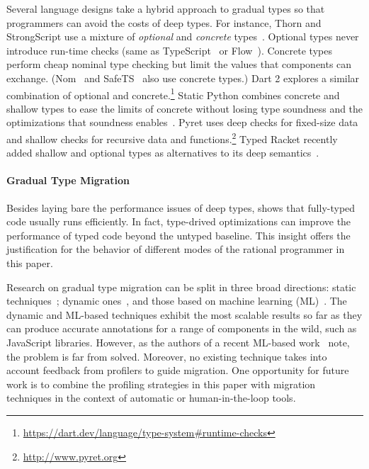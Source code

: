 Several language designs take a hybrid approach to gradual types
so that programmers can avoid the costs of deep types.
For instance, Thorn and StrongScript use a mixture of
\emph{optional} and \emph{concrete} types~\citep{wzlov-popl-2010,rzv-ecoop-2015}.
Optional types never introduce run-time checks (same as TypeScript~\cite{bat-ecoop-2014} or Flow~\cite{cvgrl-oopsla-2017}).
Concrete types perform cheap nominal type checking but limit the values that components
can exchange.
(Nom~\cite{mt-oopsla-2017,mt-oopsla-2021} and SafeTS~\cite{rsfbv-popl-2015} also use concrete types.)
Dart 2 explores a similar combination of optional and concrete.\footnote{\url{https://dart.dev/language/type-system\#runtime-checks}}
Static Python combines concrete and shallow types to ease the limits
of concrete without losing type soundness and the optimizations that soundness enables~\citep{lgmvpk-pj-2023}.
Pyret uses deep checks for fixed-size data and shallow checks for recursive
data and functions.\footnote{\url{http://www.pyret.org}}
Typed Racket recently added shallow and optional types as alternatives to its deep
semantics~\cite{g-deep-shallow}.

\paragraph{Gradual Type Migration} Besides laying bare the performance issues
of deep types, \citet{gtnffvf-jfp-2019} shows that fully-typed code usually
runs efficiently.
In fact, type-drived optimizations can improve the performance of typed code
beyond the untyped baseline.
This insight offers the justification for the behavior of different modes of
the rational programmer in this paper.

Research on gradual type migration can be split in three broad directions:
static techniques~\cite{rch:in-out-infer-gt, km:ts-type-evo,
mp:gt-decidable, ccew:gt-migrate, gc:gt-infer,
cagg-solver-based-migration,clps-popl-2020,js-infer,ruby-static-infer,unif-infer};
dynamic
ones~\cite{msi:gt-infer-hm, dyn-infer-ruby, profile-guided-typing, gen-ts-decl, jstrace},
and those based on machine learning
(ML)~\cite{lambdanet,nl2ptype,learn-types-big-data,ml-ts}. The dynamic
and ML-based techniques exhibit the most scalable results so far as they
can produce accurate annotations for a range of components in the wild,
such as JavaScript libraries. However, as the authors of a recent
ML-based work~\cite{ml-ts} note, the problem is far from solved.
Moreover, no existing technique takes into account feedback from profilers to
guide migration.
One opportunity for future work is to combine the profiling strategies in this
paper with migration techniques in the context of automatic or
human-in-the-loop tools.
 

